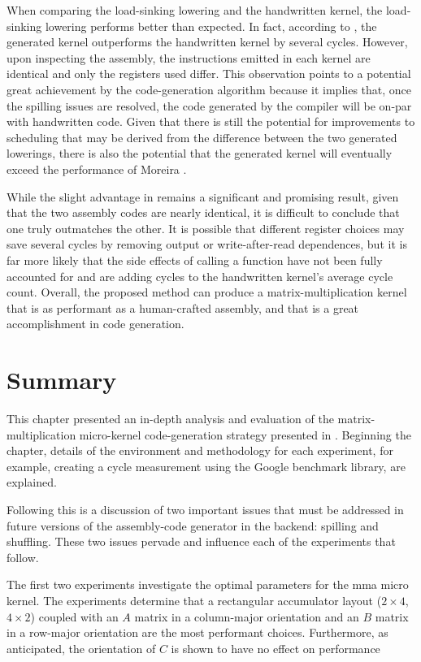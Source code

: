 \documentclass[\main/thesis.tex]{subfiles}
\begin{document}
When comparing the load-sinking \gls{lowering} and the handwritten kernel, the load-sinking \gls{lowering} performs better than expected.
In fact, according to , the generated kernel outperforms the handwritten kernel by several cycles.
However, upon inspecting the assembly, the instructions emitted in each kernel are identical and only the registers used differ.
This observation points to a potential great achievement by the code-generation algorithm because it implies that, once the spilling issues are resolved, the code generated by the compiler will be on-par with handwritten code.
Given that there is still the potential for improvements to scheduling that may be derived from the difference between the two generated \glspl{lowering}, there is also the potential that the generated kernel will eventually exceed the performance of Moreira \etal.

While the slight advantage in  remains a significant and promising result, given that the two assembly codes are nearly identical, it is difficult to conclude that one truly outmatches the other.
It is possible that different register choices may save several cycles by removing output or write-after-read dependences, but it is far more likely that the side effects of calling a function have not been fully accounted for and are adding cycles to the handwritten kernel's average cycle count.
Overall, the proposed method can produce a matrix-multiplication kernel that is as performant as a human-crafted assembly, and that is a great accomplishment in code generation.

\section{Summary}
This chapter presented an in-depth analysis and evaluation of the matrix-multiplication micro-kernel code-generation strategy presented in .
Beginning the chapter, details of the environment and methodology for each experiment, for example, creating a cycle measurement using the Google benchmark library, are explained.

Following this is a discussion of two important issues that must be addressed in future versions of the assembly-code generator in the backend: spilling and shuffling.
These two issues pervade and influence each of the experiments that follow.

The first two experiments investigate the optimal parameters for the \gls{mma} micro kernel.
The experiments determine that a rectangular accumulator layout ($2 \times 4$, $4 \times 2$) coupled with an $A$ matrix in a column-major orientation and an $B$ matrix in a row-major orientation are the most performant choices.
Furthermore, as anticipated, the orientation of $C$ is shown to have no effect on performance
\end{document}
